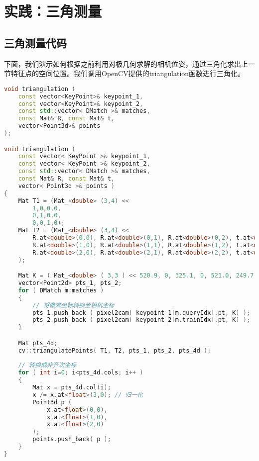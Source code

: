 \section{实践：三角测量}
\subsection{三角测量代码}
下面，我们演示如何根据之前利用对极几何求解的相机位姿，通过三角化求出上一节特征点的空间位置。我们调用OpenCV提供的triangulation函数进行三角化。

\begin{lstlisting}[language=c++,caption=slambook/ch7/triangulation.cpp（片断）]
void triangulation (
	const vector<KeyPoint>& keypoint_1,
	const vector<KeyPoint>& keypoint_2,
	const std::vector< DMatch >& matches,
	const Mat& R, const Mat& t,
	vector<Point3d>& points
);

void triangulation ( 
	const vector< KeyPoint >& keypoint_1, 
	const vector< KeyPoint >& keypoint_2, 
	const std::vector< DMatch >& matches,
	const Mat& R, const Mat& t, 
	vector< Point3d >& points )
{
	Mat T1 = (Mat_<double> (3,4) <<
		1,0,0,0,
		0,1,0,0,
		0,0,1,0);
	Mat T2 = (Mat_<double> (3,4) <<
		R.at<double>(0,0), R.at<double>(0,1), R.at<double>(0,2), t.at<double>(0,0),
		R.at<double>(1,0), R.at<double>(1,1), R.at<double>(1,2), t.at<double>(1,0),
		R.at<double>(2,0), R.at<double>(2,1), R.at<double>(2,2), t.at<double>(2,0)
	);

	Mat K = ( Mat_<double> ( 3,3 ) << 520.9, 0, 325.1, 0, 521.0, 249.7, 0, 0, 1 );
	vector<Point2d> pts_1, pts_2;
	for ( DMatch m:matches )
	{
		// 将像素坐标转换至相机坐标
		pts_1.push_back ( pixel2cam( keypoint_1[m.queryIdx].pt, K) );
		pts_2.push_back ( pixel2cam( keypoint_2[m.trainIdx].pt, K) );
	}

	Mat pts_4d;
	cv::triangulatePoints( T1, T2, pts_1, pts_2, pts_4d );
	
    // 转换成非齐次坐标
    for ( int i=0; i<pts_4d.cols; i++ )
    {
	    Mat x = pts_4d.col(i);
	    x /= x.at<float>(3,0); // 归一化
	    Point3d p (
		    x.at<float>(0,0), 
		    x.at<float>(1,0), 
		    x.at<float>(2,0) 
	    );
	    points.push_back( p );
    }
}
\end{lstlisting}

